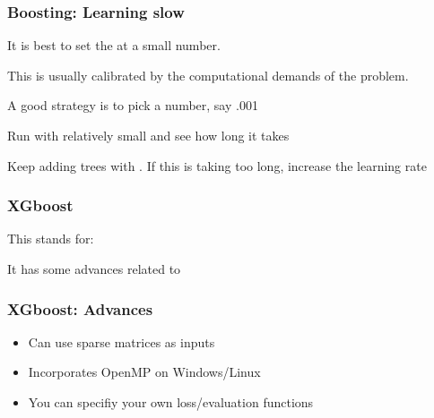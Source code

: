 \documentclass[12pt]{beamer}
\begin{document}
\begin{frame}[fragile]
\frametitle{Boosting: Learning slow}
It is best to set the  at a small number.

\vsp
This is usually calibrated by the computational demands of the problem.  

\vsp
A good strategy is to pick a number, say .001

\vsp
Run with  relatively small and see how long it takes

\vsp
Keep adding trees with .  If this is taking too long, increase the learning rate
\end{frame}


\begin{frame}[fragile]
\frametitle{XGboost}
This stands for:
\vsp


\vsp
It has some advances related to 
\end{frame}

\begin{frame}[fragile]
\frametitle{XGboost: Advances}
\begin{itemize}
\item {} Can use sparse matrices as inputs 

\item {} Incorporates OpenMP on Windows/Linux 


\item {} You can specifiy your own loss/evaluation functions

\end{itemize}
\end{frame}
\end{document}

